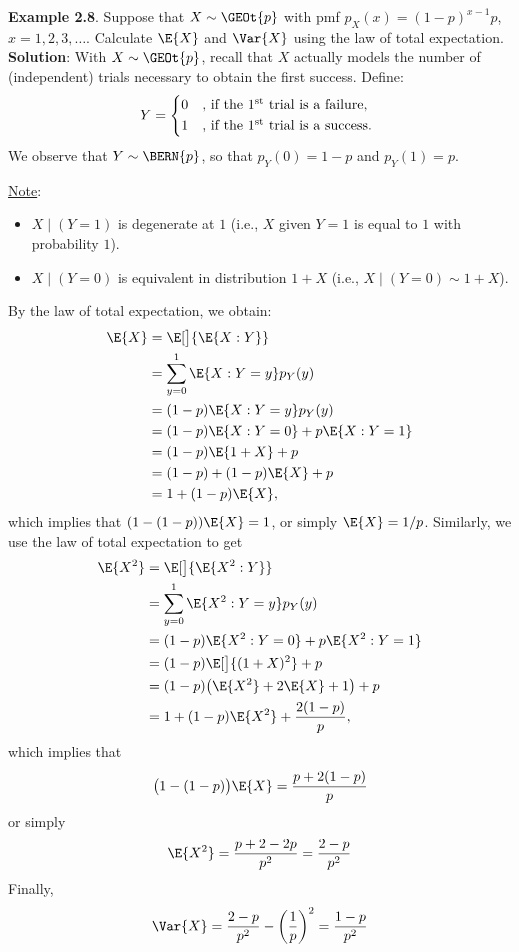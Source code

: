 \begin{Example}
    \textbf{Example 2.8}. Suppose that $ X \sim \GEOt{p} $ with pmf $ p_X(x)=(1-p)^{x-1}p $, $ x=1,2,3,\ldots $.
    Calculate $ \E{X} $ and $ \Var{X} $ using the law of total expectation.
    \tcblower{}
    \textbf{Solution}: With $ X \sim \GEOt{p} $, recall that $ X $ actually models the number of (independent) trials
    necessary to obtain the first success. Define:
    \[ Y=\begin{cases*}
            0 & , if the $1\textsuperscript{st}$ trial is a failure, \\
            1 & , if the $1\textsuperscript{st}$ trial is a success.
        \end{cases*} \]
    We observe that $ Y \sim \BERN{p} $, so that $ p_Y(0)=1-p $ and $ p_Y(1)=p $.

    \underline{Note}:
    \begin{itemize}
        \item $ X\mid(Y=1) $ is degenerate at $ 1 $ (i.e., $ X $ given $ Y=1 $ is equal to $ 1 $ with probability $ 1 $).
        \item $ X\mid(Y=0) $ is equivalent in distribution $ 1+X $ (i.e., $ X\mid(Y=0)\sim 1+X $).
    \end{itemize}
    By the law of total expectation, we obtain:
    \begin{align*}
        \E{X}
         & =\E[\big]{\E{X\given Y}}               \\
         & =\sum_{y=0}^{1} \E{X\given Y=y}p_Y(y)  \\
         & =(1-p)\E{X\given Y=y}p_Y(y)            \\
         & =(1-p)\E{X\given Y=0}+p\E{X\given Y=1} \\
         & =(1-p)\E{1+X}+p                        \\
         & =(1-p)+(1-p)\E{X}+p                    \\
         & =1+(1-p)\E{X},
    \end{align*}
    which implies that $ (1-(1-p))\E{X}=1 $, or simply $ \E{X}=1/p $. Similarly, we use the law of total expectation
    to get
    \begin{align*}
        \E{X^2}
         & =\E[\big]{\E{X^2\given Y}}                 \\
         & =\sum_{y=0}^{1} \E{X^2\given Y=y}p_Y(y)    \\
         & =(1-p)\E{X^2\given Y=0}+p\E{X^2\given Y=1} \\
         & =(1-p)\E[\big]{(1+X)^2}+p                  \\
         & =(1-p)\bigl(\E{X^2}+2\E{X}+1\bigr)+p       \\
         & =1+(1-p)\E{X^2}+\frac{2(1-p)}{p},
    \end{align*}
    which implies that
    \[ \bigl(1-(1-p)\bigr)\E{X}=\frac{p+2(1-p)}{p} \]
    or simply
    \[ \E{X^2}=\frac{p+2-2p}{p^2}=\frac{2-p}{p^2} \]
    Finally,
    \[ \Var{X}
        =\frac{2-p}{p^2} -\biggl(\frac{1}{p} \biggr)^2
        =\frac{1-p}{p^2}\]
\end{Example}
